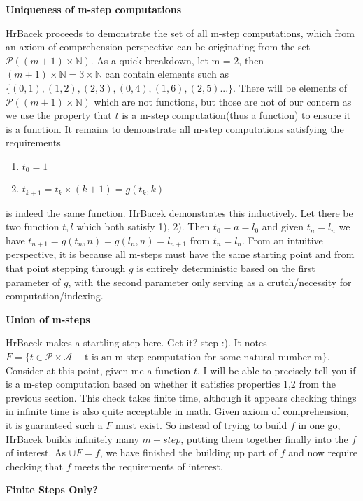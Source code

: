 \documentclass{article}
\begin{document}
\medskip
\textbf{Uniqueness of m-step computations}
\medskip

HrBacek proceeds to demonstrate the set of all m-step computations, which from an axiom of comprehension perspective can be originating from the set $\mathcal{P}((m + 1) \times \mathbb{N})$. As a quick breakdown, let m = 2, then $(m + 1) \times \mathbb{N} = 3 \times \mathbb{N}$ can contain elements such as $\{(0,1),(1,2),(2,3),(0,4),(1,6),(2,5)...\}$. There will be elements of $\mathcal{P}((m + 1) \times \mathbb{N})$ which are not functions, but those are not of our concern as we use the property that $t$ is a m-step computation(thus a function) to ensure it is a function. It remains to demonstrate all m-step computations satisfying the requirements 
\begin{enumerate}
	\item
	$t_0 = 1$ 
	\item 
	 $t_{k + 1} = t_k \times (k + 1) = g(t_k, k)$
\end{enumerate}
 is indeed the same function. HrBacek demonstrates this inductively. Let there be two function $t,l$ which both satisfy 1), 2). Then $t_0 = a = l_0$ and given $t_n = l_n$ we have $t_{n + 1} = g(t_n, n) = g(l_n, n) = l_{n + 1}$ from $t_n = l_n$. From an intuitive perspective, it is because all m-steps must have the same starting point and from that point stepping through $g$ is entirely deterministic based on the first parameter of $g$, with the second parameter only serving as a crutch/necessity for computation/indexing.
 
 \medskip
 \textbf{Union of m-steps}
 \medskip

HrBacek makes a startling step here. Get it? step :). It notes $F = \{t \in \mathcal{P \times A} \text{ } | \text{ t is an m-step computation for some natural number m}\}$. Consider at this point, given me a function $t$, I will be able to precisely tell you if is a m-step computation based on whether it satisfies properties 1,2 from the previous section. This check takes finite time, although it appears checking things in infinite time is also quite acceptable in math. Given axiom of comprehension, it is guaranteed such a $F$ must exist. So instead of trying to build $f$ in one go, HrBacek builds infinitely many $m-step$, putting them together finally into the $f$ of interest. As $\cup F = f$, we have finished the building up part of $f$ and now require checking that $f$ meets the requirements of interest.

\medskip
\textbf{Finite Steps Only?}
\medskip
\end{document}
